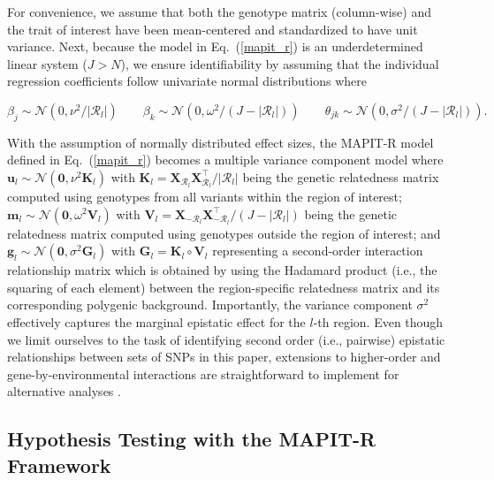 \documentclass[10pt,a4paper]{article}
\def\eq#1{(\ref{#1})}
\newcommand{\bg}{\mathbf{g}}
\newcommand{\bu}{\mathbf{u}}
\newcommand{\bfm}{\mathbf{m}}
\newcommand{\bK}{\mathbf{K}}
\newcommand{\bV}{\mathbf{V}}
\newcommand{\bX}{\mathbf{X}}
\newcommand{\bG}{\mathbf{G}}
\newcommand{\T}{\intercal}
\newcommand{\N}{\mathcal{N}}
\begin{document}
For convenience, we assume that both the genotype matrix (column-wise) and the trait of interest have been mean-centered and standardized to have unit variance. Next, because the model in Eq.~\eq{mapit_r} is an underdetermined linear system ($J > N$), we ensure identifiability by assuming that the individual regression coefficients follow univariate normal distributions where 
\begin{linenomath*}
\begin{equation}
\beta_j\sim \N(0,\nu^2/|\mathcal{R}_l|) \quad \quad \beta_k\sim\N(0,\omega^2/(J-|\mathcal{R}_l|)) \quad \quad \theta_{jk}\sim\N(0,\sigma^2/(J-|\mathcal{R}_l|)).\label{coef}
\end{equation}
\end{linenomath*}
With the assumption of normally distributed effect sizes, the MAPIT-R model defined in Eq.~\eq{mapit_r} becomes a multiple variance component model where $\bu_l\sim\N(\bm{0},\nu^2\bK_l)$ with $\bK_l = \bX_{\mathcal{R}_l}\bX_{\mathcal{R}_l}^{\T}/|\mathcal{R}_l|$ being the genetic relatedness matrix computed using genotypes from all variants within the region of interest; $\bfm_l \sim \N(\bm{0}, \omega^2\bV_l)$ with $\bV_l = \bX_{-\mathcal{R}_l}\bX_{-\mathcal{R}_l}^{\T}/(J-|\mathcal{R}_l|)$ being the genetic relatedness matrix computed using genotypes outside the region of interest; and $\bg_l \sim \N(\bm{0},\sigma^2\bG_l)$ with $\bG_l = \bK_l \circ \bV_l$ representing a second-order interaction relationship matrix which is obtained by using the Hadamard product (i.e., the squaring of each element) between the region-specific relatedness matrix and its corresponding polygenic background. Importantly, the variance component $\sigma^2$ effectively captures the marginal epistatic effect for the $l$-th region. Even though we limit ourselves to the task of identifying second order (i.e., pairwise) epistatic relationships between sets of SNPs in this paper, extensions to higher-order and gene-by-environmental interactions are straightforward to implement for alternative analyses \cite{Jiang:2015aa,Crawford2017a,Zhou2017,Crawford:2018ab,Moore:2019aa}.

\subsection*{Hypothesis Testing with the MAPIT-R Framework}
\end{document}
